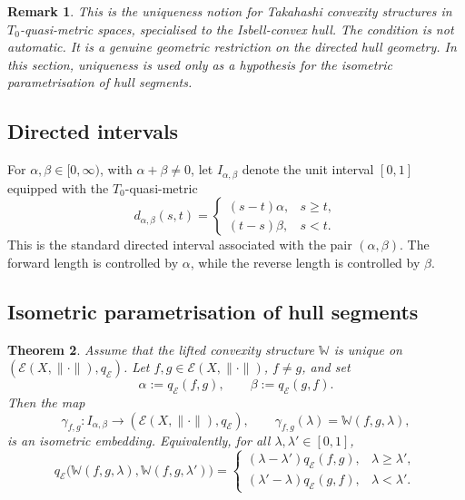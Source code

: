 \documentclass[preprint,12pt]{elsarticle}
\numberwithin{equation}{section}
\newtheorem{theorem}{Theorem}[section]
\newtheorem{remark}[theorem]{Remark}
\newcommand{\E}{\mathcal{E}}
\begin{document}
\begin{remark}\label{rem:uniqW-context}
This is the uniqueness notion for Takahashi convexity structures in
\(T_0\)-quasi-metric spaces, specialised to the Isbell-convex hull.  The
condition is not automatic.  It is a genuine geometric restriction on the
directed hull geometry.  In this section, uniqueness is used only as a
hypothesis for the isometric parametrisation of hull segments.
\end{remark}

\subsection{Directed intervals}

For \(\alpha,\beta\in[0,\infty)\), with \(\alpha+\beta\neq0\), let
\(I_{\alpha,\beta}\) denote the unit interval \([0,1]\) equipped with the
\(T_0\)-quasi-metric
\[
d_{\alpha,\beta}(s,t)
=
\begin{cases}
(s-t)\alpha, & s\ge t,\\[2mm]
(t-s)\beta, & s<t.
\end{cases}
\]
This is the standard directed interval associated with the pair
\((\alpha,\beta)\).  The forward length is controlled by \(\alpha\), while the
reverse length is controlled by \(\beta\).

\subsection{Isometric parametrisation of hull segments}

\begin{theorem}\label{thm:segmentIsom}
Assume that the lifted convexity structure \(\mathbb W\) is unique on
\((\E(X,\|\cdot\|),q_{\E})\).  Let \(f,g\in\E(X,\|\cdot\|)\), \(f\neq g\), and
set
\[
\alpha:=q_{\E}(f,g),
\qquad
\beta:=q_{\E}(g,f).
\]
Then the map
\[
\gamma_{f,g}:I_{\alpha,\beta}\longrightarrow (\E(X,\|\cdot\|),q_{\E}),
\qquad
\gamma_{f,g}(\lambda)=\mathbb W(f,g,\lambda),
\]
is an isometric embedding.  Equivalently, for all
\(\lambda,\lambda'\in[0,1]\),
\[
q_{\E}\bigl(\mathbb W(f,g,\lambda),\mathbb W(f,g,\lambda')\bigr)
=
\begin{cases}
(\lambda-\lambda')q_{\E}(f,g), & \lambda\ge \lambda',\\[2mm]
(\lambda'-\lambda)q_{\E}(g,f), & \lambda<\lambda'.
\end{cases}
\]
\end{theorem}
\end{document}
